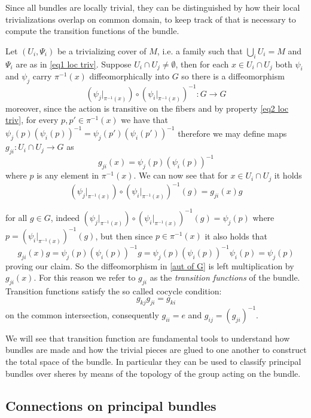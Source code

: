 \documentclass{article}
\theoremstyle{definition}
\theoremstyle{remark}
\begin{document}
Since all bundles are locally trivial, they can be distinguished by how their local trivializations overlap on common domain, to keep track of that is necessary to compute the transition functions of the bundle.

Let \((U_i,\Psi_i)\) be a trivializing cover of \(M\), i.e. a family such that \(\bigcup_iU_i=M\) and \(\Psi_i\) are as in \ref{eq1 loc triv}. Suppose \(U_i\cap U_j\not =\emptyset\), then for each \(x\in U_i\cap U_j\) both \(\psi_i\) and \(\psi_j\) carry \(\pi^{-1}(x)\) diffeomorphically into \(G\) so there is a diffeomorphism
\[(\psi_j|_{\pi^{-1}(x)})\circ (\psi_i|_{\pi^{-1}(x)})^{-1}\colon G\to G\]
moreover, since the action is transitive on the fibers and by property \ref{eq2 loc triv}, for every \(p,p'\in \pi^{-1}(x)\) we have that \(\psi_j(p)(\psi_i(p))^{-1}=\psi_j(p')(\psi_i(p'))^{-1}\) therefore we may define maps \(g_{ji}\colon U_i\cap U_j \to G\) as
\begin{equation}\label{transition fns}
    g_{ji}(x)=\psi_j(p)(\psi_i(p))^{-1}
\end{equation}
where \(p\) is any element in \(\pi^{-1}(x)\).
We can now see that for \(x\in U_i\cap U_j\) it holds
\begin{equation}\label{aut of G}
    (\psi_j|_{\pi^{-1}(x)})\circ (\psi_i|_{\pi^{-1}(x)})^{-1}(g) = g_{ji}(x)g
\end{equation}

for all \(g\in G\), indeed \((\psi_j|_{\pi^{-1}(x)}) \circ (\psi_i|_{\pi^{-1}(x)})^{-1}(g)=\psi_j(p)\) where \(p=(\psi_i|_{\pi^{-1}(x)})^{-1}(g)\), but then since \(p\in \pi^{-1}(x)\) it also holds that \[g_{ji}(x)g=\psi_j(p)(\psi_i(p))^{-1}g=\psi_j(p)(\psi_i(p))^{-1}\psi_i(p)=\psi_j(p)\]
proving our claim. So the diffeomorphism in \ref{aut of G} is left multiplication by \(g_{ji}(x)\). For this reason we refer to \(g_{ji}\) as the \emph{transition functions} of the bundle.
Transition functions satisfy the so called cocycle condition:
\[g_{kj}g_{ji}=g_{ki}\]
on the common intersection, consequently \(g_{ii}=e\) and \(g_{ij}=(g_{ji})^{-1}\).


We will see that transition function are fundamental tools to understand how bundles are made and how the trivial pieces are glued to one another to construct the total space of the bundle. In particular they can be used to classify principal bundles over sheres by means of the topology of the group acting on the bundle.

\subsection{Connections on principal bundles}
\end{document}

